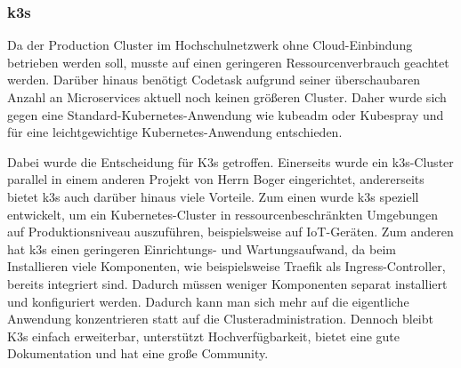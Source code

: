 \subsubsection{k3s}

Da der Production Cluster im Hochschulnetzwerk ohne Cloud-Einbindung betrieben werden soll, musste auf einen geringeren Ressourcenverbrauch geachtet werden.
Darüber hinaus benötigt Codetask aufgrund seiner überschaubaren Anzahl an Microservices aktuell noch keinen größeren Cluster.
Daher wurde sich gegen eine Standard-Kubernetes-Anwendung wie kubeadm oder Kubespray und für eine leichtgewichtige Kubernetes-Anwendung entschieden.

Dabei wurde die Entscheidung für K3s getroffen. Einerseits wurde ein k3s-Cluster parallel in einem anderen Projekt von Herrn Boger eingerichtet, andererseits bietet k3s auch darüber hinaus viele Vorteile.
Zum einen wurde k3s speziell entwickelt, um ein Kubernetes-Cluster in ressourcenbeschränkten Umgebungen auf Produktionsniveau auszuführen, beispielsweise auf IoT-Geräten.
Zum anderen hat k3s einen geringeren Einrichtungs- und Wartungsaufwand, da beim Installieren viele Komponenten, wie beispielsweise Traefik als Ingress-Controller, bereits integriert sind. Dadurch müssen weniger Komponenten separat installiert und konfiguriert werden.
Dadurch kann man sich mehr auf die eigentliche Anwendung konzentrieren statt auf die Clusteradministration.
Dennoch bleibt K3s einfach erweiterbar, unterstützt Hochverfügbarkeit, bietet eine gute Dokumentation und hat eine große Community.